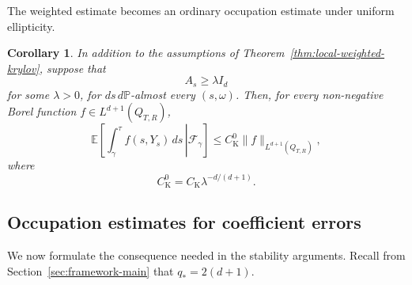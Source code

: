 \documentclass[12pt,oneside, reqno]{amsart}
\newtheorem{corollary}[theorem]{Corollary}
\numberwithin{equation}{section}
\begin{document}
	
	The weighted estimate becomes an ordinary occupation estimate under	uniform ellipticity.
	
	\begin{corollary}
		\label{cor:unweighted-local-krylov}
		In addition to the assumptions of
		Theorem~\ref{thm:local-weighted-krylov}, suppose that
		\begin{equation}
			\label{eq:krylov-uniform-ellipticity}
			A_s\ge\lambda I_d
		\end{equation}
		for some $\lambda>0$, for $ds\,d\mathbb P$-almost every
		$(s,\omega)$. Then, for every non-negative Borel function
		$f\in L^{d+1}(Q_{T,R})$,
		\begin{equation}
			\label{eq:unweighted-conditional-krylov}
			\mathbb E\left[
			\left.
			\int_\gamma^\tau f(s,Y_s)\,ds
			\,\right|\mathcal F_\gamma
			\right]
			\le
			C_{\mathrm K}^{0}
			\|f\|_{L^{d+1}(Q_{T,R})},
		\end{equation}
		where 
		\[
		C_{\mathrm K}^{0}=	C_{\mathrm K}\lambda^{-d/(d+1)}.
		\]
	\end{corollary}
	
	
	
	\subsection{Occupation estimates for coefficient errors}
	
	We now formulate the consequence needed in the stability arguments. Recall from Section~\ref{sec:framework-main} that	\(q_\ast=2(d+1).\)
	
\end{document}
